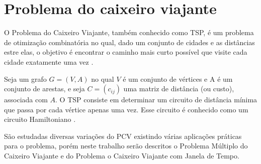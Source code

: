 


\section{Problema do caixeiro viajante}

O Problema do Caixeiro Viajante, também conhecido como \ac{TSP}, é um problema de otimização combinatória no qual, dado um conjunto de cidades e as distâncias estre elas, o objetivo é encontrar o caminho mais curto possível que visite cada cidade exatamente uma vez \cite{goyal:2010}.

Seja um grafo $G = (V,A)$ no qual $V$ é um conjunto de vértices e A é um conjunto de arestas, e seja $C = (c_{ij})$ uma matriz de distância (ou custo), associada com $A$. O \ac{TSP} consiste em determinar um circuito de distância mínima que passa por cada vértice apenas uma vez. Esse circuito é conhecido como um circuito Hamiltoniano \cite{laporte:1992}.

São estudadas diversas variações do \ac{PCV} existindo várias aplicações práticas para o problema, porém neste trabalho serão descritos o Problema Múltiplo do Caixeiro Viajante e do Problema o Caixeiro Viajante com Janela de Tempo. 

